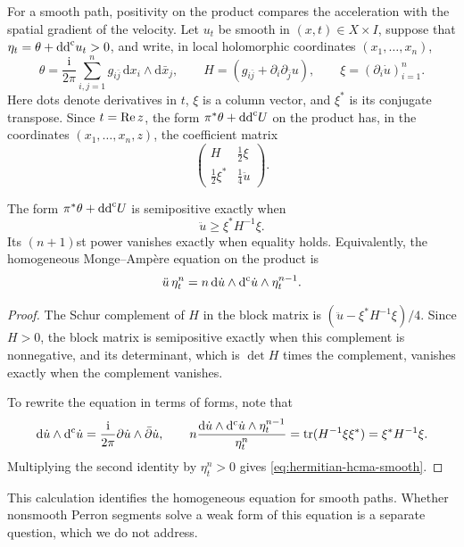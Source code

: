 For a smooth path, positivity on the product compares the acceleration with the spatial gradient of the velocity. Let $u_t$ be smooth in $(x,t)\in X\times I$, suppose that $\eta_t=\theta+\mathrm{dd}^{\mathrm{c}} u_t>0$, and write, in local holomorphic coordinates $(x_1,\ldots,x_n)$,
\[
 \theta=\frac{\mathrm i}{2\pi}\sum_{i,j=1}^n
        g_{i\bar j}\,\mathrm dx_i\wedge\mathrm d\bar x_j,
 \qquad H=(g_{i\bar j}+\partial_i\partial_{\bar j}u),
 \qquad \xi=(\partial_i\dot u)_{i=1}^n.
\]
Here dots denote derivatives in $t$, $\xi$ is a column vector, and $\xi^*$ is its conjugate transpose. Since $t=\operatorname{Re} z$, the form $\pi^*\theta+\mathrm{dd}^{\mathrm{c}} U$ on the product has, in the coordinates $(x_1,\ldots,x_n,z)$, the coefficient matrix
\[
 \begin{pmatrix}
 H&\tfrac12\xi\\
 \tfrac12\xi^*&\tfrac14\ddot u
 \end{pmatrix}.
\]

\begin{proposition}\label{prop:hermitian-schur-geodesic}
The form $\pi^*\theta+\mathrm{dd}^{\mathrm{c}} U$ is semipositive exactly when
\[
 \ddot u\geq\xi^*H^{-1}\xi.
\]
Its $(n+1)$st power vanishes exactly when equality holds. Equivalently, the homogeneous Monge--Amp\`ere equation on the product is
\begin{equation}\label{eq:hermitian-hcma-smooth}
 \ddot u\,\eta_t^n
 =n\,\mathrm{d}\dot u\wedge\mathrm d^{\mathrm c}\dot u\wedge\eta_t^{n-1}.
\end{equation}
\end{proposition}
\begin{proof}
The Schur complement of $H$ in the block matrix is $(\ddot u-\xi^*H^{-1}\xi)/4$. Since $H>0$, the block matrix is semipositive exactly when this complement is nonnegative, and its determinant, which is $\det H$ times the complement, vanishes exactly when the complement vanishes.

To rewrite the equation in terms of forms, note that
\[
 \mathrm{d}\dot u\wedge\mathrm d^{\mathrm c}\dot u=\frac{\mathrm i}{2\pi}\partial\dot u\wedge\bar\partial\dot u,
 \qquad
 n\frac{\mathrm{d}\dot u\wedge\mathrm d^{\mathrm c}\dot u\wedge\eta_t^{n-1}}{\eta_t^n}
 =\operatorname{tr}(H^{-1}\xi\xi^*)=\xi^*H^{-1}\xi.
\]
Multiplying the second identity by $\eta_t^n>0$ gives \eqref{eq:hermitian-hcma-smooth}.
\end{proof}

This calculation identifies the homogeneous equation for smooth paths. Whether nonsmooth Perron segments solve a weak form of this equation is a separate question, which we do not address.

